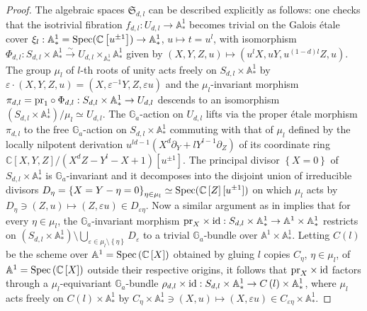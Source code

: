 \documentclass[10pt,oneside,english]{amsart}
\numberwithin{equation}{section}
\numberwithin{figure}{section}
\theoremstyle{plain}
\theoremstyle{remark}
\theoremstyle{plain}
\theoremstyle{plain}
\theoremstyle{definition}
\begin{document}
\begin{proof}
The algebraic spaces $\mathfrak{S}_{d,l}$ can be described explicitly
as follows: one checks that the isotrivial fibration $f_{d,l}:U_{d,l}\rightarrow\mathbb{A}_{*}^{1}$
becomes trivial on the Galois \'etale cover $\xi_{l}:\mathbb{A}_{*}^{1}={\rm Spec}(\mathbb{C}\left[u^{\pm1}\right])\rightarrow\mathbb{A}_{*}^{1}$,
$u\mapsto t=u^{l}$, with isomorphism $\Phi_{d,l}:S_{d,l}\times\mathbb{A}_{*}^{1}\stackrel{\sim}{\longrightarrow}U_{d,l}\times_{\mathbb{A}_{*}^{1}}\mathbb{A}_{*}^{1}$
given by $\left(X,Y,Z,u\right)\mapsto(u^{l}X,uY,u^{\left(1-d\right)l}Z,u)$.
The group $\mu_{l}$ of $l$-th roots of unity acts freely on $S_{d,l}\times\mathbb{A}_{*}^{1}$
by $\varepsilon\cdot\left(X,Y,Z,u\right)=\left(X,\varepsilon^{-1}Y,Z,\varepsilon u\right)$
and the $\mu_{l}$-invariant morphism $\pi_{d,l}={\rm pr}_{1}\circ\Phi_{d,l}:S_{d,l}\times\mathbb{A}_{*}^{1}\rightarrow U_{d,l}$
descends to an isomorphism $(S_{d,l}\times\mathbb{A}_{*}^{1})/\mu_{l}\simeq U_{d,l}$.
The $\mathbb{G}_{a}$-action on $U_{d,l}$ lifts via the proper \'etale
morphism $\pi_{d,l}$ to the free $\mathbb{G}_{a}$-action on $S_{d,l}\times\mathbb{A}_{*}^{1}$
commuting with that of $\mu_{l}$ defined by the locally nilpotent
derivation $u^{ld-1}(X^{d}\partial_{Y}+lY^{l-1}\partial_{Z})$ of
its coordinate ring $\mathbb{C}\left[X,Y,Z\right]/\left(X^{d}Z-Y^{l}-X+1\right)\left[u^{\pm1}\right]$.
The principal divisor $\left\{ X=0\right\} $ of $S_{d,l}\times\mathbb{A}_{*}^{1}$
is $\mathbb{G}_{a}$-invariant and it decomposes into the disjoint
union of irreducible divisors $D_{\eta}=\left\{ X=Y-\eta=0\right\} _{\eta\in\mu_{l}}\simeq{\rm Spec}(\mathbb{C}\left[Z\right][u^{\pm1}])$
on which $\mu_{l}$ acts by $D_{\eta}\ni(Z,u)\mapsto(Z,\varepsilon u)\in D_{\varepsilon\eta}$.
Now a similar argument as in \cite[Lemma 1.2]{Fieseler1994} implies
that for every $\eta\in\mu_{l}$, the $\mathbb{G}_{a}$-invariant
morphism ${\rm pr}_{X}\times{\rm id}:S_{d,l}\times\mathbb{A}_{*}^{1}\rightarrow\mathbb{A}^{1}\times\mathbb{A}_{*}^{1}$
restricts on $(S_{d,l}\times\mathbb{A}_{*}^{1})\setminus\bigcup_{\varepsilon\in\mu_{l}\setminus\left\{ \eta\right\} }D_{\varepsilon}$
to a trivial $\mathbb{G}_{a}$-bundle over $\mathbb{A}^{1}\times\mathbb{A}_{*}^{1}$.
Letting $C\left(l\right)$ be the scheme over $\mathbb{A}^{1}={\rm Spec}\left(\mathbb{C}\left[X\right]\right)$
obtained by gluing $l$ copies $C_{\eta}$, $\eta\in\mu_{l}$, of
$\mathbb{A}^{1}={\rm Spec}\left(\mathbb{C}\left[X\right]\right)$
outside their respective origins, it follows that ${\rm pr}_{X}\times{\rm id}$
factors through a $\mu_{l}$-equivariant $\mathbb{G}_{a}$-bundle
$\rho_{d,l}\times{\rm id}:S_{d,l}\times\mathbb{A}_{*}^{1}\rightarrow C\left(l\right)\times\mathbb{A}_{*}^{1}$,
where $\mu_{l}$ acts freely on $C\left(l\right)\times\mathbb{A}_{*}^{1}$
by $C_{\eta}\times\mathbb{A}_{*}^{1}\ni\left(X,u\right)\mapsto\left(X,\varepsilon u\right)\in C_{\varepsilon\eta}\times\mathbb{A}_{*}^{1}$. 


\end{proof}
\end{document}
